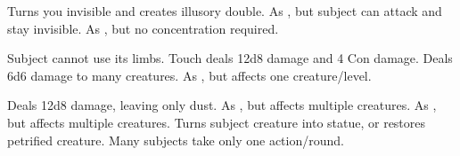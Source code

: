 \begin{swspelllist}
   Turns you invisible and creates illusory double.
   As , but subject can attack and stay invisible.
   As , but no concentration required.

   Subject cannot use its limbs. 
   Touch deals 12d8 damage and 4 Con damage.
   Deals 6d6 damage to many creatures.
   As , but affects one creature/level.

   Deals 12d8 damage, leaving only dust.
   As , but affects multiple creatures.
   As , but affects multiple creatures.
   Turns subject creature into statue, or restores petrified creature.
   Many subjects take only one action/round.
\end{swspelllist}

